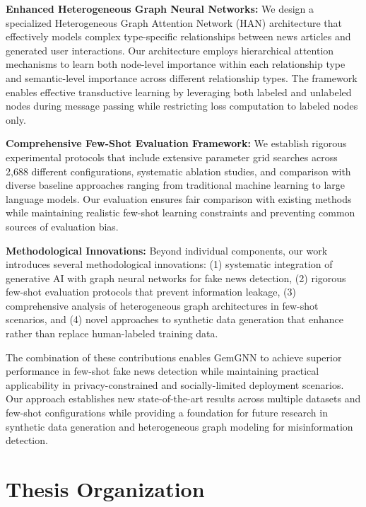 
\textbf{Enhanced Heterogeneous Graph Neural Networks:} We design a specialized Heterogeneous Graph Attention Network (HAN) architecture that effectively models complex type-specific relationships between news articles and generated user interactions. Our architecture employs hierarchical attention mechanisms to learn both node-level importance within each relationship type and semantic-level importance across different relationship types. The framework enables effective transductive learning by leveraging both labeled and unlabeled nodes during message passing while restricting loss computation to labeled nodes only.

\textbf{Comprehensive Few-Shot Evaluation Framework:} We establish rigorous experimental protocols that include extensive parameter grid searches across 2,688 different configurations, systematic ablation studies, and comparison with diverse baseline approaches ranging from traditional machine learning to large language models. Our evaluation ensures fair comparison with existing methods while maintaining realistic few-shot learning constraints and preventing common sources of evaluation bias.


\textbf{Methodological Innovations:} Beyond individual components, our work introduces several methodological innovations: (1) systematic integration of generative AI with graph neural networks for fake news detection, (2) rigorous few-shot evaluation protocols that prevent information leakage, (3) comprehensive analysis of heterogeneous graph architectures in few-shot scenarios, and (4) novel approaches to synthetic data generation that enhance rather than replace human-labeled training data.

The combination of these contributions enables GemGNN to achieve superior performance in few-shot fake news detection while maintaining practical applicability in privacy-constrained and socially-limited deployment scenarios. Our approach establishes new state-of-the-art results across multiple datasets and few-shot configurations while providing a foundation for future research in synthetic data generation and heterogeneous graph modeling for misinformation detection.

\section{Thesis Organization}


